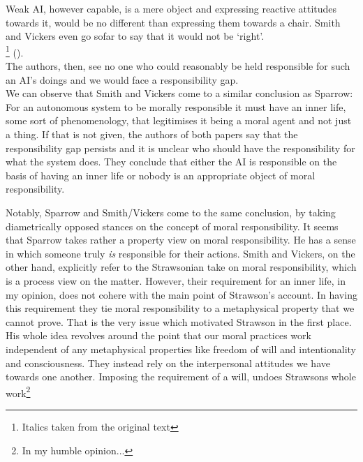 \documentclass{article}
\begin{document}
Weak AI, however capable, is a mere object and expressing reactive attitudes
towards it, would be no different than expressing them towards a chair. Smith
and Vickers even go sofar to say that it would not be `right'.\\

\footnote{Italics
taken from the original text} (\cite[p. 4-5]{SmithVickers2021}).\\

The authors,
then, see no one who could reasonably be held responsible for such an AI's doings
and we would face a responsibility gap.\\

We can observe that Smith and Vickers come to a similar conclusion as Sparrow:
For an autonomous system to be morally responsible it must have an inner life,
some sort of phenomenology, that legitimises it being a moral agent and not just
a thing. If that is not given, the authors of both papers say that the
responsibility gap persists and it is unclear who should have the responsibility
for what the system does. They conclude that either the AI is responsible on the
basis of having an inner life or nobody is an appropriate object of moral
responsibility.

Notably, Sparrow and Smith/Vickers come to the same conclusion, by taking
diametrically opposed stances on the concept of moral responsibility. It seems
that Sparrow takes rather a property view on moral responsibility. He has a
sense in which someone truly \textit{is} responsible for their actions. Smith
and Vickers, on the other hand, explicitly refer to the Strawsonian take on
moral responsibility, which is a process view on the matter. However, their
requirement for an inner life, in my opinion, does not cohere with the main point
of Strawson's account. In having this requirement they tie moral responsibility
to a metaphysical property that we cannot prove. That is the very issue which
motivated Strawson in the first place. His whole idea revolves around the point
that our moral practices work independent of any metaphysical properties like
freedom of will and intentionality and consciousness. They instead rely on the
interpersonal attitudes we have towards one another. Imposing the requirement of
a will, undoes Strawsons whole work\footnote{In my humble opinion...}
\end{document}
